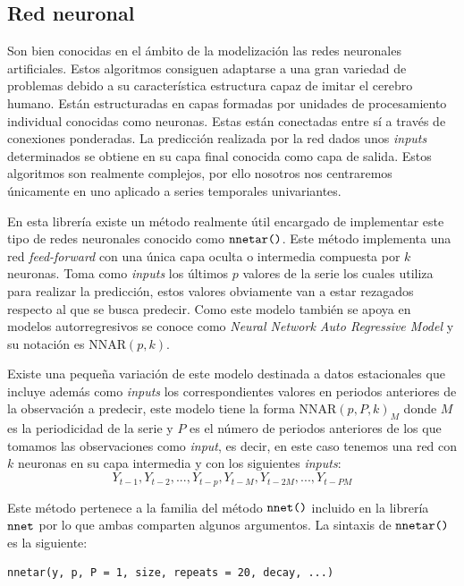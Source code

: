 \subsection{Red neuronal}
Son bien conocidas en el ámbito de la modelización las redes neuronales artificiales. Estos algoritmos consiguen adaptarse a una gran variedad de problemas debido a su característica estructura capaz de imitar el cerebro humano. Están estructuradas en capas formadas por unidades de procesamiento individual conocidas como neuronas. Estas están conectadas entre sí a través de conexiones ponderadas. La predicción realizada por la red dados unos \textit{inputs} determinados se obtiene en su capa final conocida como capa de salida. Estos algoritmos son realmente complejos, por ello nosotros nos centraremos únicamente en uno aplicado a series temporales univariantes.

En esta librería existe un método realmente útil encargado de implementar este tipo de redes neuronales conocido como $\verb!nnetar()!$.  Este método implementa una red \textit{feed-forward} con una única capa oculta o intermedia compuesta por $k$ neuronas. Toma como \textit{inputs} los últimos $p$ valores de la serie los cuales utiliza para realizar la predicción, estos valores obviamente van a estar rezagados respecto al que se busca predecir. Como este modelo también se apoya en modelos autorregresivos se conoce como \textit{Neural Network Auto Regressive  Model} y su notación es NNAR$(p, k)$.

Existe una pequeña variación de este modelo destinada a datos estacionales  que incluye además como \textit{inputs} los correspondientes valores en periodos anteriores de la observación a predecir, este modelo tiene la forma NNAR$(p, P, k)_M$ donde $M$ es la periodicidad de la serie y $P$ es el número de periodos anteriores de los que tomamos las observaciones como \textit{input}, es decir, en este caso tenemos una red con $k$ neuronas en su capa intermedia y con los siguientes \textit{inputs}:
\begin{equation}
    Y_{t-1}, Y_{t-2},...,Y_{t-p}, Y_{t-M}, Y_{t-2M},...,Y_{t-PM}
\end{equation}

Este método pertenece a la familia del método $\verb!nnet()!$ incluido en la librería $\verb!nnet!$ por lo que ambas comparten algunos argumentos. La sintaxis de $\verb!nnetar()!$ es la siguiente:
\begin{Verbatim}[fontsize=\footnotesize]
nnetar(y, p, P = 1, size, repeats = 20, decay, ...)
\end{Verbatim}


